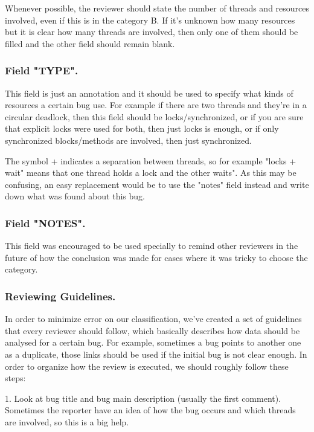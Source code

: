 Whenever possible, the reviewer should state the number of threads and resources involved, even if this is in the category B. If it's unknown how many resources but it is clear how many threads are involved, then only one of them should be filled and the other field should remain blank.

\subsubsection{Field "TYPE".}

This field is just an annotation and it should be used to specify what kinds of resources a certain bug use. For example if there are two threads and they're in a circular deadlock, then this field should be locks/synchronized, or if you are sure that explicit locks were used for both, then just locks is enough, or if only synchronized blocks/methods are involved, then just synchronized.

The symbol + indicates a separation between threads, so for example "locks + wait" means that one thread holds a lock and the other waits". As this may be confusing, an easy replacement would be to use the "notes" field instead and write down what was found about this bug.

\subsubsection{Field "NOTES".}

This field was encouraged to be used specially to remind other reviewers in the future of how the conclusion was made for cases where it was tricky to choose the category.

\subsubsection{Reviewing Guidelines.} 

In order to minimize error on our classification, we've created a set of guidelines that every reviewer should follow, which basically describes how data should be analysed for a certain bug. For example, sometimes a bug points to another one as a duplicate, those links should be used if the initial bug is not clear enough. In order to organize how the review is executed, we should roughly follow these steps:

1. Look at bug title and bug main description (usually the first comment). Sometimes the reporter have an idea of how the bug occurs and which threads are involved, so this is a big help.

